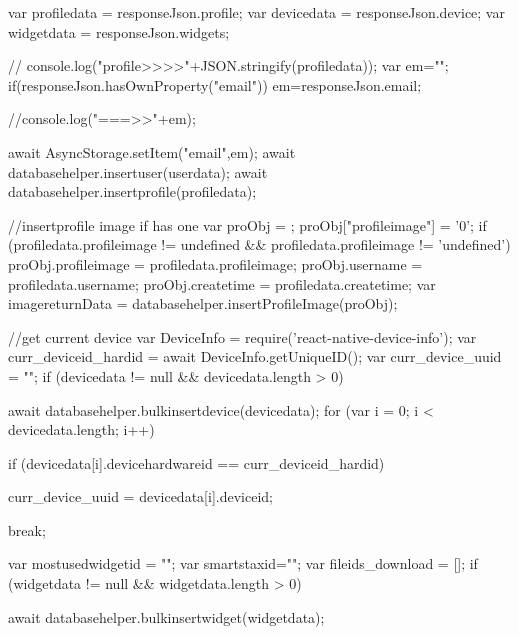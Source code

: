 {{{{{{{{{{{{{{                            var profiledata = responseJson.profile;
                            var devicedata = responseJson.device;
                            var widgetdata = responseJson.widgets;


                            //  console.log("profile>>>>"+JSON.stringify(profiledata));
                            var em="";
                            if(responseJson.hasOwnProperty("email")) 
                              em=responseJson.email;

                           //console.log("\n\nem===>>"+em);

                            await AsyncStorage.setItem("email",em);
                            await databasehelper.insertuser(userdata);
                            await databasehelper.insertprofile(profiledata);

                            //insertprofile image if has one 
                            var proObj = {};
                            proObj["profileimage"] = '0';
                            if (profiledata.profileimage != undefined && profiledata.profileimage != 'undefined') {
                              proObj.profileimage = profiledata.profileimage;
                            }
                            proObj.username = profiledata.username;
                            proObj.createtime = profiledata.createtime;
                            var imagereturnData = databasehelper.insertProfileImage(proObj);

                            //get current device
                            var DeviceInfo = require('react-native-device-info');
                            var curr_deviceid_hardid = await DeviceInfo.getUniqueID();
                            var curr_device_uuid = "";
                            if (devicedata != null && devicedata.length > 0) {
                              await databasehelper.bulkinsertdevice(devicedata);
                              for (var i = 0; i < devicedata.length; i++) {

                                if (devicedata[i].devicehardwareid == curr_deviceid_hardid) {
                                  curr_device_uuid = devicedata[i].deviceid;

                                  break;
                                }

                              }

                            }

                            var mostusedwidgetid = "";
                            var smartstaxid="";
                            var fileids_download = [];
                            if (widgetdata != null && widgetdata.length > 0) {
                              await databasehelper.bulkinsertwidget(widgetdata);

}}}}}}}}}}}}}}}
